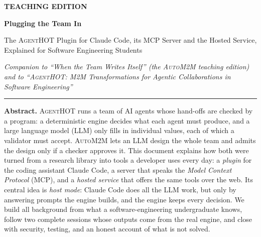 \documentclass[10pt,a4paper]{article}
\newcommand{\tool}{\textsc{AgentHOT}}
\newcommand{\auto}{\textsc{AutoM2M}}
\newcommand{\cc}{Claude Code}
\begin{document}
\thispagestyle{plain}
\begin{center}
{\sffamily\footnotesize\bfseries\color{accent}\MakeUppercase{Teaching edition}}\par
\vspace{6pt}
{\sffamily\bfseries\fontsize{22}{26}\selectfont\color{accent}Plugging the Team In\par}
\vspace{6pt}
{\sffamily\large The \tool{} Plugin for \cc{}, its MCP Server and the Hosted Service,\\
Explained for Software Engineering Students\par}
\vspace{10pt}
{\small\itshape Companion to ``When the Team Writes Itself'' (the \auto{} teaching edition)~\cite{autom2mteaching}\\
and to ``\tool{}: M2M Transformations for Agentic Collaborations in Software Engineering''~\cite{agenthot2026}\par}
\vspace{8pt}
{\color{accent!40}\rule{0.35\textwidth}{0.6pt}}
\end{center}
\vspace{4pt}

\begin{tcolorbox}[enhanced, colback=accentlight, colframe=accentlight, arc=0pt,
   boxrule=0pt, borderline west={2.2pt}{0pt}{accent}, left=10pt, right=10pt,
   top=7pt, bottom=7pt]
{\sffamily\bfseries\color{accent}Abstract.}\enspace
\tool{} runs a team of AI agents whose hand-offs are checked by a program:
a deterministic engine decides what each agent must produce, and a large
language model (LLM) only fills in individual values, each of which a
validator must accept. \auto{} lets an LLM design the whole team and admits
the design only if a checker approves it. This document explains how both
were turned from a research library into tools a developer uses every day:
a \emph{plugin} for the coding assistant \cc{}, a server that speaks the
\emph{Model Context Protocol} (MCP), and a \emph{hosted service} that offers
the same tools over the web. Its central idea is \emph{host mode}: \cc{} does
all the LLM work, but only by answering prompts the engine builds, and the
engine keeps every decision. We build all background from what a
software-engineering undergraduate knows, follow two complete sessions whose
outputs come from the real engine, and close with security, testing, and an
honest account of what is not solved.
\end{tcolorbox}
\end{document}
